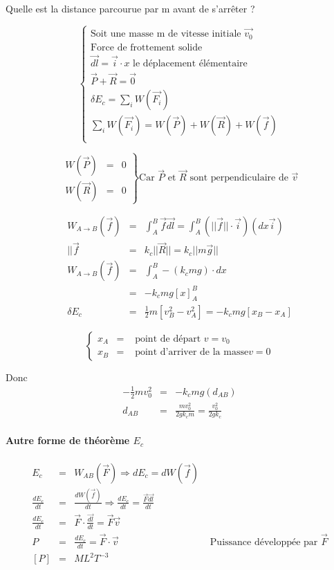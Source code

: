 	Quelle est la distance parcourue par m avant de s'arrêter ?

	\[\left\{\begin{array}{c}
		\text{Soit une masse m de vitesse initiale } \vec{v_0} \\
		\text{Force de frottement solide } \\
		\vec{dl} = \vec{i}\cdot x \text{ le déplacement élémentaire } \\
		\vec{P} + \vec{R} = \vec{0} \\
		\delta E_c = \sum_iW(\vec{F_i})\\
		\sum_iW(\vec{F_i}) = W(\vec{P}) + W(\vec{R}) + W(\vec{f}) \\
	\end{array}\right.\]

	\[\left.\begin{array}{rcl}
			W(\vec{P}) &=& 0 \\
			W(\vec{R}) &=& 0 
	\end{array}\right\}
	\text{Car } \vec{P} \text{ et } \vec{R} \text{ sont perpendiculaire de } \vec{v}\]


	\[\begin{array}{rcl}
			W_{A \to B} (\vec{f}) &=& \int_A^B \vec{f}\vec{dl} = \int_A^B (||\vec{f}||\cdot \vec{i}) (dx \vec{i}) \\
			||\vec{f} &=& k_c ||\vec{R}|| = k_c ||m\vec{g}|| \\
			W_{A \to B} (\vec{f}) &=& \int_A^B -(k_c mg)\cdot dx \\
					  &=& -k_c mg[x]^B_A \\
			\delta E_c &=& \frac{1}{2} m [v_B^2 - v^2_A] = -k_c mg[x_B - x_A]
	\end{array}\]

	\[\left\{\begin{array}{rcl}
		x_A &=& \text{ point de départ } v = v_0 \\
		x_B &=& \text{ point d'arriver de la masse} v = 0 
		\end{array}\right.\]

		Donc
		\[\begin{array}{rcl}
				-\frac{1}{2} m v_0^2 &=& -k_c mg(d_{AB}) \\
				d_{AB} &=& \frac{mv_0^2}{2gk_cm} = \frac{v_0^2}{2gk_c}
		\end{array}\]
	

		\paragraph{Autre forme de théorème $E_c$}
		\[\begin{array}{rclr}
			E_c &=& W_{AB} (\vec{F}) \Rightarrow dE_c = dW(\vec{f}) \\
				\frac{dE_c}{dt} &=& \frac{dW(\vec{f})}{dt} \Rightarrow \frac{dE_c}{dt} = \frac{\vec{F}\vec{dl}}{dt} \\
				\frac{dE_c}{dt} &=& \vec{F}\cdot \frac{\vec{dl}}{dt} = \vec{F}\vec{v} \\
				P &=& \frac{dE_c}{dt} = \vec{F}\cdot \vec{v} & \text{ Puissance développée par } \vec{F} \\
				{[P]} &=& ML^2 T^{-3}
		\end{array}\]


